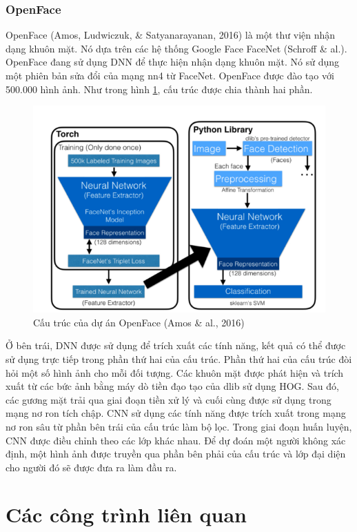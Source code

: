 \documentclass[a4paper]{report}
\begin{document}
\subsubsection{OpenFace}
OpenFace (Amos, Ludwiczuk, \& Satyanarayanan, 2016) là một thư viện nhận dạng khuôn mặt. Nó dựa trên các hệ thống Google Face FaceNet (Schroff \& al.). OpenFace đang sử dụng DNN để thực hiện nhận dạng khuôn mặt. Nó sử dụng một phiên bản sửa đổi của mạng nn4 từ FaceNet. OpenFace được đào tạo với 500.000 hình ảnh. Như trong hình \ref{fig:openface}, cấu trúc được chia thành hai phần. 
%
\begin{figure}[H]
\centering
\includegraphics[scale=.5]{../images/fig/2-23.png}
\caption{Cấu trúc của dự án OpenFace (Amos \& al., 2016)}
\label{fig:openface}
\end{figure}
%
Ở bên trái, DNN được sử dụng để trích xuất các tính năng, kết quả có thể được sử dụng trực tiếp trong phần thứ hai của cấu trúc. Phần thứ hai của cấu trúc đòi hỏi một số hình ảnh cho mỗi đối tượng. Các khuôn mặt được phát hiện và trích xuất từ các bức ảnh bằng máy dò tiền đạo tạo của dlib sử dụng HOG. Sau đó, các gương mặt trải qua giai đoạn tiền xử lý và cuối cùng được sử dụng trong mạng nơ ron tích chập. CNN sử dụng các tính năng được trích xuất trong mạng nơ ron sâu từ phần bên trái của cấu trúc làm bộ lọc. Trong giai đoạn huấn luyện, CNN được điều chỉnh theo các lớp khác nhau. Để dự đoán một người không xác định, một hình ảnh được truyền qua phần bên phải của cấu trúc và lớp đại diện cho người đó sẽ được đưa ra làm đầu ra.

\section{Các công trình liên quan}
\end{document}
